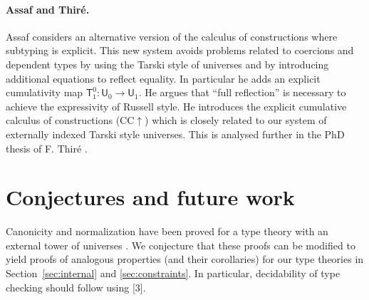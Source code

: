 \documentclass[11pt,a4paper]{article}
\theoremstyle{definition}
\newcommand{\UU}{\mathsf{U}}
\newcommand{\T}{\mathsf{T}}
\begin{document}



\paragraph{Assaf and Thir\'e.}

Assaf \cite{Assaf14} considers an alternative version of the calculus of
constructions where subtyping is explicit. This new system avoids problems related to coercions and dependent types by using the Tarski style
of universes and by introducing additional equations to reflect equality. In particular he adds an explicit cumulativity map $\T^0_1 : \UU_0 \to \UU_1$. He argues that ``full reflection'' is necessary to achieve the expressivity of Russell style. He introduces the explicit cumulative calculus of constructions (CC$\uparrow$) which is closely related to our system of externally indexed Tarski style universes.
This is analysed further in the PhD thesis of F. Thir\'e \cite{Thire20}.

\section{Conjectures and future work}\label{sec:future}

Canonicity and normalization have been proved for a type theory with an external tower of universes \cite{coquand:tcs2019}. We conjecture that these proofs can be modified to yield proofs of analogous properties (and their corollaries) for our type theories in Section~\ref{sec:internal} and \ref{sec:constraints}.
%
In particular, decidability of type checking should follow using [3].
\end{document}
